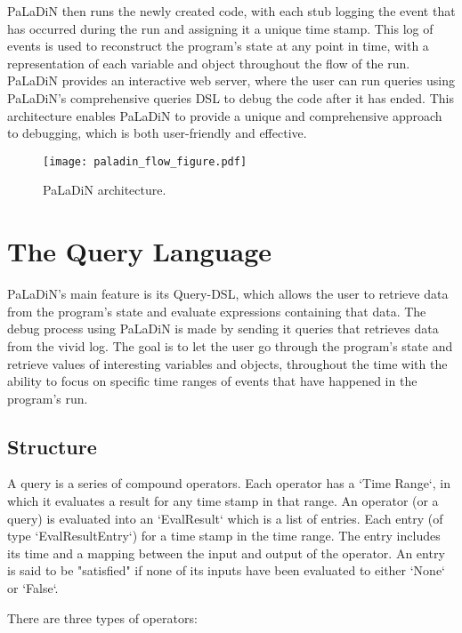 \documentclass[sigconf,review]{acmart}
\begin{document}
    PaLaDiN then runs the newly created code, with each stub logging the event that has occurred during the run and
    assigning it a unique time stamp. This log of events is used to reconstruct the program's state at any point in time,
    with a representation of each variable and object throughout the flow of the run. PaLaDiN provides an interactive web
    server, where the user can run queries using PaLaDiN's comprehensive queries DSL to debug the code after it has ended.
    This architecture enables PaLaDiN to provide a unique and comprehensive approach to debugging, which is both
    user-friendly and effective.

    \begin{figure}
        \centering
        \texttt{[image: paladin\_flow\_figure.pdf]}
        \caption{
            PaLaDiN architecture.
        }
        \Description{}
        \label{paladin_flow}
    \end{figure}


    \section{The Query Language}

    PaLaDiN's main feature is its Query-DSL, which allows the user to retrieve data from the program's state and evaluate expressions containing that data. The debug process using PaLaDiN is made by sending it queries that retrieves data from the vivid log. The goal is to let the user go through the program's state and retrieve values of interesting variables and objects, throughout the time with the ability to focus on specific time ranges of events that have happened in the program's run.

    \subsection{Structure}
    A query is a series of compound operators. Each operator has a `Time Range`, in which it evaluates a result for any time stamp in that range. An operator (or a query) is evaluated into an `EvalResult` which is a list of entries. Each entry (of type `EvalResultEntry`) for a time stamp in the time range. The entry includes its time and a mapping between the input and output of the operator. An entry is said to be "satisfied" if none of its inputs have been evaluated to either `None` or `False`.

    There are three types of operators:
\end{document}
